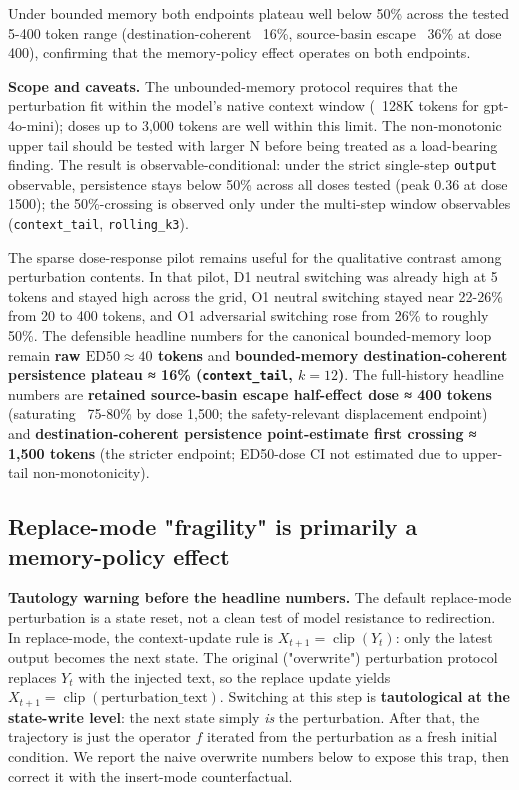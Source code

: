 \documentclass{article}
\theoremstyle{plain}
\theoremstyle{definition}
\begin{document}
Under bounded memory both endpoints plateau well below 50\% across the tested 5-400 token range (destination-coherent ~16\%, source-basin escape ~36\% at dose 400), confirming that the memory-policy effect operates on both endpoints.

\textbf{Scope and caveats.} The unbounded-memory protocol requires that the perturbation fit within the model's native context window (~128K tokens for gpt-4o-mini); doses up to 3,000 tokens are well within this limit. The non-monotonic upper tail should be tested with larger N before being treated as a load-bearing finding. The result is observable-conditional: under the strict single-step \texttt{output} observable, persistence stays below 50\% across all doses tested (peak 0.36 at dose 1500); the 50\%-crossing is observed only under the multi-step window observables (\texttt{context\_tail}, \texttt{rolling\_k3}).

The sparse dose-response pilot remains useful for the qualitative contrast among perturbation contents. In that pilot, D1 neutral switching was already high at 5 tokens and stayed high across the grid, O1 neutral switching stayed near 22-26\% from 20 to 400 tokens, and O1 adversarial switching rose from 26\% to roughly 50\%. The defensible headline numbers for the canonical bounded-memory loop remain \textbf{raw $\mathrm{ED50} \approx 40$ tokens} and \textbf{bounded-memory destination-coherent persistence plateau ≈ 16\% (\texttt{context\_tail}, $k=12$)}. The full-history headline numbers are \textbf{retained source-basin escape half-effect dose ≈ 400 tokens} (saturating ~75-80\% by dose 1,500; the safety-relevant displacement endpoint) and \textbf{destination-coherent persistence point-estimate first crossing ≈ 1,500 tokens} (the stricter endpoint; ED50-dose CI not estimated due to upper-tail non-monotonicity).

\subsection{Replace-mode "fragility" is primarily a memory-policy effect}

\textbf{Tautology warning before the headline numbers.} The default replace-mode perturbation is a state reset, not a clean test of model resistance to redirection. In replace-mode, the context-update rule is \(X_{t+1}=\operatorname{clip}(Y_t)\): only the latest output becomes the next state. The original ("overwrite") perturbation protocol replaces \(Y_t\) with the injected text, so the replace update yields \(X_{t+1}=\operatorname{clip}(\text{perturbation\_text})\). Switching at this step is \textbf{tautological at the state-write level}: the next state simply \textit{is} the perturbation. After that, the trajectory is just the operator \(f\) iterated from the perturbation as a fresh initial condition. We report the naive overwrite numbers below to expose this trap, then correct it with the insert-mode counterfactual.
\end{document}
